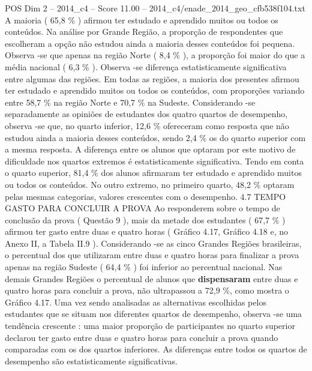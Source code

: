 \begin{textsample}{POS Dim 2 – 2014\_c4 – Score 11.00 – 2014\_c4/enade\_2014\_geo\_cfb538f104.txt}
A maioria ( 65,8 \% ) afirmou ter estudado e aprendido muitos ou todos os conteúdos.
Na análise por Grande Região, a proporção de respondentes que escolheram a opção não estudou ainda a maioria desses conteúdos foi pequena.
Observa -se que apenas na região Norte ( 8,4 \% ), a proporção foi maior do que a média nacional ( 6,3 \% ).
Observa -se diferença estatisticamente significativa entre algumas das regiões.
Em todas as regiões, a maioria dos presentes afirmou ter estudado e aprendido muitos ou todos os conteúdos, com proporções variando entre 58,7 \% na região Norte e 70,7 \% na Sudeste.
Considerando -se separadamente as opiniões de estudantes dos quatro quartos de desempenho, observa -se que, no quarto inferior, 12,6 \% ofereceram como resposta que não estudou ainda a maioria desses conteúdos, sendo 2,4 \% os do quarto superior com a mesma resposta.
A diferença entre os alunos que optaram por este motivo de dificuldade nos quartos extremos é estatisticamente significativa.
Tendo em conta o quarto superior, 81,4 \% dos alunos afirmaram ter estudado e aprendido muitos ou todos os conteúdos.
No outro extremo, no primeiro quarto, 48,2 \% optaram pelas mesmas categorias, valores crescentes com o desempenho. 4.7 TEMPO GASTO PARA CONCLUIR A PROVA Ao responderem sobre o tempo de conclusão da prova ( Questão 9 ), mais da metade dos estudantes ( 67,7 \% ) afirmou ter gasto entre duas e quatro horas ( Gráfico 4.17, Gráfico 4.18 e, no Anexo II, a Tabela II.9 ).
Considerando -se as cinco Grandes Regiões brasileiras, o percentual dos que utilizaram entre duas e quatro horas para finalizar a prova apenas na região Sudeste ( 64,4 \% ) foi inferior ao percentual nacional.
Nas demais Grandes Regiões o percentual de alunos que \textbf{dispensaram} entre duas e quatro horas para concluir a prova, não ultrapassou a 72,9 \%, como mostra o Gráfico 4.17.
Uma vez sendo analisadas as alternativas escolhidas pelos estudantes que se situam nos diferentes quartos de desempenho, observa -se uma tendência crescente : uma maior proporção de participantes no quarto superior declarou ter gasto entre duas e quatro horas para concluir a prova quando comparadas com os dos quartos inferiores.
As diferenças entre todos os quartos de desempenho são estatisticamente significativas.

\end{textsample}
